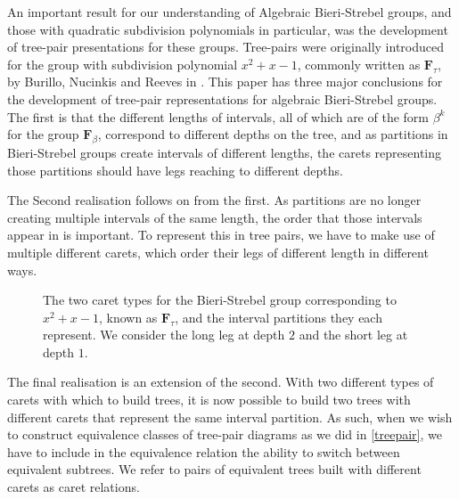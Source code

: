 \documentclass[
11pt, %
english, %
singlespacing, %
parskip, %
headsepline, %
]{amsart} %
\theoremstyle{definition}
\newcommand{\FN}[1]{$\textbf{F}_{#1}$}
\begin{document}
An important result for our understanding of Algebraic Bieri-Strebel groups, and those with quadratic subdivision polynomials in particular, was the development of tree-pair presentations for these groups. Tree-pairs were originally introduced for the group with subdivision polynomial $x^2+x-1$, commonly written as \FN{\tau}, by Burillo, Nucinkis and Reeves in \cite{Ftau}. This paper has three major conclusions for the development of tree-pair representations for algebraic Bieri-Strebel groups. The first is that the different lengths of intervals, all of which are of the form $\beta^k$ for the group \FN{\beta}, correspond to different depths on the tree, and as partitions in Bieri-Strebel groups create intervals of different lengths, the carets representing those partitions should have legs reaching to different depths.
\par
The Second realisation follows on from the first. As partitions are no longer creating multiple intervals of the same length, the order that those intervals appear in is important. To represent this in tree pairs, we have to make use of multiple different carets, which order their legs of different length in different ways.

\begin{center}
\begin{figure}[H]
\centering
{}
\caption{The two caret types for the Bieri-Strebel group corresponding to $x^2+x-1$, known as $\textbf{F}_\tau$, and the interval partitions they each represent. We consider the long leg at depth $2$ and the short leg at depth $1$. }\label{taucarets}
\end{figure}
\end{center}

The final realisation is an extension of the second. With two different types of carets with which to build trees, it is now possible to build two trees with different carets that represent the same interval partition. As such, when we wish to construct equivalence classes of tree-pair diagrams as we did in \ref{treepair}, we have to include in the equivalence relation the ability to switch between equivalent subtrees. We refer to pairs of equivalent trees built with different carets as caret relations.
\end{document}
